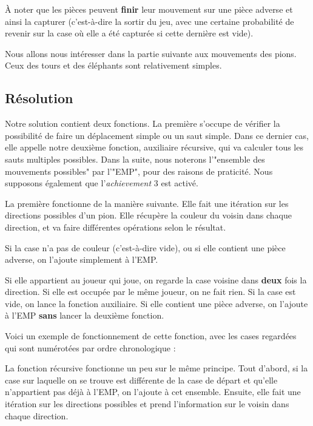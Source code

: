 \documentclass[a4paper]{article}
\begin{document}
À noter que les pièces peuvent \textbf{finir} leur mouvement sur une pièce adverse et ainsi la capturer (c'est-à-dire la sortir du jeu, avec une certaine probabilité de revenir sur la case où elle a été capturée si cette dernière est vide).

\vspace{0.5cm}

Nous allons nous intéresser dans la partie suivante aux mouvements des pions. Ceux des tours et des éléphants sont relativement simples.

\subsection{Résolution}
\label{resolv}

Notre solution contient deux fonctions. La première s'occupe de vérifier la possibilité de faire un déplacement simple ou un saut simple. Dans ce dernier cas, elle appelle notre deuxième fonction, auxiliaire récursive, qui va calculer tous les sauts multiples possibles. Dans la suite, nous noterons l'"ensemble des mouvements possibles" par l'"EMP", pour des raisons de praticité. Nous supposons également que l'\emph{achievement} 3 est activé.

\vspace{0.5cm}

La première fonctionne de la manière suivante. Elle fait une itération sur les directions possibles d'un pion. Elle récupère la couleur du voisin dans chaque direction, et va faire différentes opérations selon le résultat.

Si la case n'a pas de couleur (c'est-à-dire vide), ou si elle contient une pièce adverse, on l'ajoute simplement à l'EMP. 

Si elle appartient au joueur qui joue, on regarde la case voisine dans \textbf{deux} fois la direction. Si elle est occupée par le même joueur, on ne fait rien. Si la case est vide, on lance la fonction auxiliaire. Si elle contient une pièce adverse, on l'ajoute à l'EMP \textbf{sans} lancer la deuxième fonction.

Voici un exemple de fonctionnement de cette fonction, avec les cases regardées qui sont numérotées par ordre chronologique :


\vspace{0.5cm}

La fonction récursive fonctionne un peu sur le même principe. Tout d'abord, si la case sur laquelle on se trouve est différente de la case de départ et qu'elle n'appartient pas déjà à l'EMP, on l'ajoute à cet ensemble. Ensuite, elle fait une itération sur les directions possibles et prend l'information sur le voisin dans chaque direction.
\end{document}
